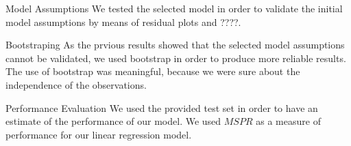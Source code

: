 \documentclass[a4paper,11pt]{article}
\begin{document}
\begin{section}
\begin{subsection}{Model Assumptions}
We tested the selected model in order to validate the initial model assumptions by means of residual plots and ????.
\end{subsection}
\begin{subsection}{Bootstraping}
As the prvious results showed that the selected model assumptions cannot be validated, we used bootstrap in order to produce more reliable results. The use of bootstrap was meaningful, because we were sure about the independence of the observations.
\end{subsection}
\begin{subsection}{Performance Evaluation}
We used the provided test set in order to have an estimate of the performance of our model. We used $MSPR$ as a measure of performance for our linear regression model.
\end{subsection}
\end{section}
\end{document}
